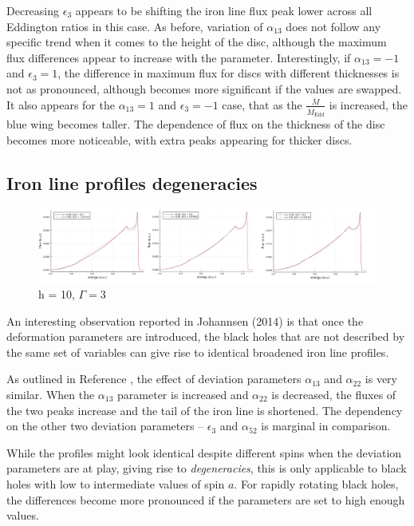 \documentclass[fleqn,usenatbib,useAMS]{mnras}
\begin{document}
Decreasing $\epsilon_{3}$ appears to be shifting the iron line flux peak lower across all Eddington ratios in this case. As before, variation of $\alpha_{13}$ does not follow any specific trend when it comes to the height of the disc, although the maximum flux differences appear to increase with the parameter.  Interestingly, if $\alpha_{13} = -1$ and $\epsilon_{3} = 1$, the difference in maximum flux for discs with different thicknesses is not as pronounced, although becomes more significant if the values are swapped. It also appears for the $\alpha_{13} = 1$ and $\epsilon_{3} = -1$ case, that as the $\frac{\dot{M}}{\dot{M}_\text{Edd}}$ is increased, the blue wing becomes taller. The dependence of flux on the thickness of the disc becomes more noticeable, with extra peaks appearing for thicker discs. 

\subsection{Iron line profiles degeneracies}

\begin{figure}[!h]
    \centering
    \includegraphics[width=0.98\linewidth]{figures/johannsen_h10_Gamma3.png}
    \caption{h = 10, $\Gamma = 3$}
    \label{johannsen_degeneracy}
\end{figure}

An interesting observation reported in Johannsen (2014) \cite{johannsen2014x} is that once the deformation parameters are introduced, the black holes that are not described by the same set of variables can give rise to identical broadened iron line profiles.

As outlined in Reference \cite{johannsen2014x}, the effect of deviation parameters $\alpha_{13}$ and $\alpha_{22}$ is very similar. When the $\alpha_{13}$ parameter is increased and $\alpha_{22}$ is decreased, the fluxes of the two peaks increase and the tail of the iron line is shortened. The dependency on the other two deviation parameters -- $\epsilon_{3}$ and $\alpha_{52}$ is marginal in comparison.

While the profiles might look identical despite different spins when the deviation parameters are at play, giving rise to \textit{degeneracies}, this is only applicable to black holes with low to intermediate values of spin $a$. For rapidly rotating black holes, the differences become more pronounced if the parameters are set to high enough values\cite{johannsen2014x}. 
\end{document}
